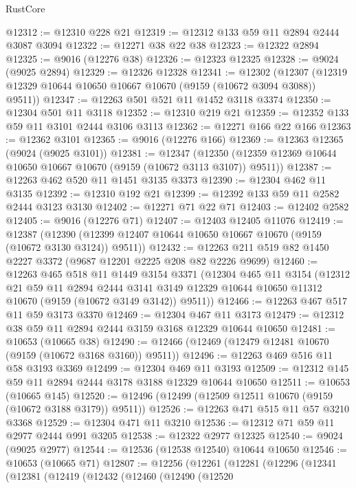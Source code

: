 \begin{lexlean}{RustCore}
\begin{coremodule}
@12312 := @12310 @228 @21
@12319 := @12312 @133 @59 @11 @2894 @2444 @3087 @3094
@12322 := @12271 @38 @22 @38
@12323 := @12322 @2894
@12325 := @9016 (@12276 @38)
@12326 := @12323 @12325
@12328 := @9024 (@9025 @2894)
@12329 := @12326 @12328
@12341 := @12302
    (@12307 (@12319 @12329 @10644 @10650 @10667 @10670 (@9159 (@10672 @3094 @3088)) @9511))
@12347 := @12263 @501 @521 @11 @1452 @3118 @3374
@12350 := @12304 @501 @11 @3118
@12352 := @12310 @219 @21
@12359 := @12352 @133 @59 @11 @3101 @2444 @3106 @3113
@12362 := @12271 @166 @22 @166
@12363 := @12362 @3101
@12365 := @9016 (@12276 @166)
@12369 := @12363 @12365 (@9024 (@9025 @3101))
@12381 := @12347
    (@12350 (@12359 @12369 @10644 @10650 @10667 @10670 (@9159 (@10672 @3113 @3107)) @9511))
@12387 := @12263 @462 @520 @11 @1451 @3135 @3373
@12390 := @12304 @462 @11 @3135
@12392 := @12310 @192 @21
@12399 := @12392 @133 @59 @11 @2582 @2444 @3123 @3130
@12402 := @12271 @71 @22 @71
@12403 := @12402 @2582
@12405 := @9016 (@12276 @71)
@12407 := @12403 @12405 @11076
@12419 := @12387
    (@12390 (@12399 @12407 @10644 @10650 @10667 @10670 (@9159 (@10672 @3130 @3124)) @9511))
@12432 := @12263 @211 @519 @82 @1450 @2227 @3372 (@9687 @12201 @2225 @208 @82 @2226 @9699)
@12460 := @12263
    @465
    @518
    @11
    @1449
    @3154
    @3371
    (@12304
      @465
      @11
      @3154
      (@12312
        @21
        @59
        @11
        @2894
        @2444
        @3141
        @3149
        @12329
        @10644
        @10650
        @11312
        @10670
        (@9159 (@10672 @3149 @3142))
        @9511))
@12466 := @12263 @467 @517 @11 @59 @3173 @3370
@12469 := @12304 @467 @11 @3173
@12479 := @12312 @38 @59 @11 @2894 @2444 @3159 @3168 @12329 @10644 @10650
@12481 := @10653 (@10665 @38)
@12490 := @12466 (@12469 (@12479 @12481 @10670 (@9159 (@10672 @3168 @3160)) @9511))
@12496 := @12263 @469 @516 @11 @58 @3193 @3369
@12499 := @12304 @469 @11 @3193
@12509 := @12312 @145 @59 @11 @2894 @2444 @3178 @3188 @12329 @10644 @10650
@12511 := @10653 (@10665 @145)
@12520 := @12496 (@12499 (@12509 @12511 @10670 (@9159 (@10672 @3188 @3179)) @9511))
@12526 := @12263 @471 @515 @11 @57 @3210 @3368
@12529 := @12304 @471 @11 @3210
@12536 := @12312 @71 @59 @11 @2977 @2444 @991 @3205
@12538 := @12322 @2977 @12325
@12540 := @9024 (@9025 @2977)
@12544 := @12536 (@12538 @12540) @10644 @10650
@12546 := @10653 (@10665 @71)
@12807 := @12256
    (@12261
      (@12281
        (@12296
          (@12341
            (@12381
              (@12419
                (@12432
                  (@12460
                    (@12490
                      (@12520

\end{coremodule}
\end{lexlean}
